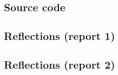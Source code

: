 \documentclass[11pt,titlepage]{report}
\begin{document}
\begin{appendices}
\renewcommand{\chapternumber}{\appendixname\space\thechapter} 

\chapter{Source code}
\label{app:sourcecode}

\section{Reflections (report 1)}
\label{appsec:sourcecode-reflections}

\section{Reflections (report 2)}
\label{appsec:sourcecode-report2}



\end{appendices}
\end{document}
